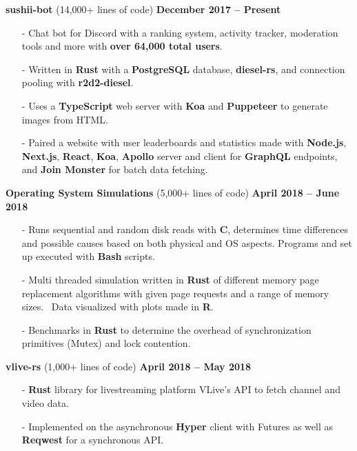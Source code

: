 \documentclass[margin,line]{res}
\begin{document}
\begin{resume}
{\bf sushii-bot} (14,000+ lines of code) \hfill {\bf December 2017 -- Present} \\
  \vspace{-3.5mm}
  \begin{itemize} \itemsep -2pt
    \item[-] Chat bot for Discord with a ranking system, activity tracker, moderation tools and more with {\bf over 64,000 total users}.
    \item[-] Written in {\bf Rust} with a {\bf PostgreSQL} database, {\bf diesel-rs}, and connection pooling with {\bf r2d2-diesel}.
    \item[-] Uses a {\bf TypeScript} web server with {\bf Koa} and {\bf Puppeteer} to generate images from HTML.
    \item[-] Paired a website with user leaderboards and statistics made with {\bf Node.js}, {\bf Next.js}, {\bf React}, {\bf Koa}, {\bf Apollo} server and client for {\bf GraphQL} endpoints,
      and {\bf Join Monster} for batch data fetching.
  \end{itemize}
{\bf Operating System Simulations} (5,000+ lines of code) \hfill {\bf April 2018 -- June 2018} \\
  \vspace{-3.5mm}
  \begin{itemize} \itemsep -2pt
    \item[-] Runs sequential and random disk reads with {\bf C}, determines time differences and possible causes based on both physical and OS aspects. 
      Programs and set up executed with {\bf Bash} scripts.
    \item[-] Multi threaded simulation written in {\bf Rust} of different memory page replacement algorithms with given page requests and a range of memory sizes. \
    Data visualized with plots made in {\bf R}.
    \item[-] Benchmarks in {\bf Rust} to determine the overhead of synchronization primitives (Mutex) and lock contention.
  \end{itemize}
{\bf vlive-rs} (1,000+ lines of code) \hfill {\bf April 2018 -- May 2018} \\
  \vspace{-3.5mm}
  \begin{itemize} \itemsep -2pt
    \item[-] {\bf Rust} library for livestreaming platform VLive's API to fetch channel and video data.
    \item[-] Implemented on the asynchronous {\bf Hyper} client with Futures as well as {\bf Reqwest} for a synchronous API.

\end{itemize}
\end{resume}
\end{document}
